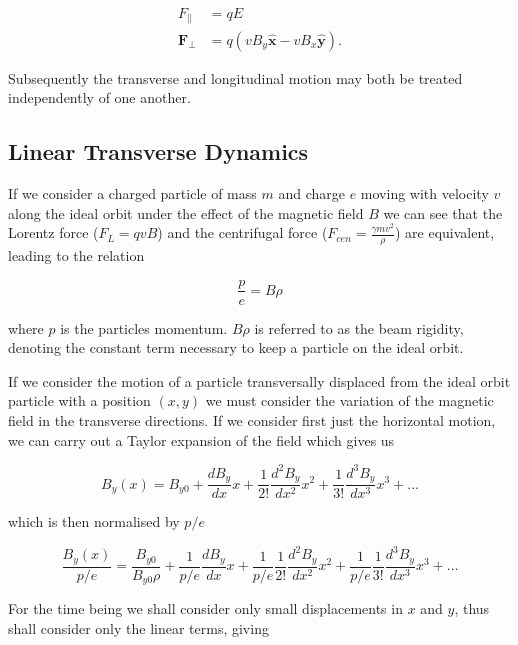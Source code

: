 \begin{align}
F_{\parallel} &= qE \\
\mathbf{F_{\perp}} &= q \left( vB_{y} \mathbf{\hat{x}} - vB_{x} \mathbf{\hat{y}} \right).
\end{align}

Subsequently the transverse and longitudinal motion may both be treated independently of one another.

\subsection{Linear Transverse Dynamics}
\label{sec:linTransMotions}

If we consider a charged particle of mass $m$ and charge $e$ moving with velocity $v$ along the ideal orbit under the effect of the magnetic field $B$ we can see that the Lorentz force ($F_{L} = qvB$) and the centrifugal force ($F_{cen} = \frac{\gamma m v^{2}}{\rho}$) are equivalent, leading to the relation

\begin{equation}
\frac{p}{e} = B \rho
\label{eqn:beam-rigid}
\end{equation}

where $p$ is the particles momentum. $B \rho$ is referred to as the beam rigidity, denoting the constant term necessary to keep a particle on the ideal orbit. 

If we consider the motion of a particle transversally displaced from the ideal orbit particle with a position $(x, y)$ we must consider the variation of the magnetic field in the transverse directions. If we consider first just the horizontal motion, we can carry out a Taylor expansion of the field which gives us

\begin{equation}
B_{y} \left( x \right) = B_{y0} + \frac{dB_{y}}{dx} x + \frac{1}{2!}\frac{d^{2}B_{y}}{dx^{2}} x^{2} + \frac{1}{3!} \frac{d^{3}B_{y}}{dx^{3}} x^{3} + ...
\end{equation}

which is then normalised by $p/e$

\begin{equation}
\frac{B_{y} \left( x \right)}{p/e} = \frac{B_{y0}}{B_{y0}\rho} + \frac{1}{p/e}\frac{dB_{y}}{dx} x + \frac{1}{p/e}\frac{1}{2!}\frac{d^{2}B_{y}}{dx^{2}} x^{2} + \frac{1}{p/e}\frac{1}{3!} \frac{d^{3}B_{y}}{dx^{3}} x^{3} + ...
\end{equation}

For the time being we shall consider only small displacements in $x$ and $y$, thus shall consider only the linear terms, giving

